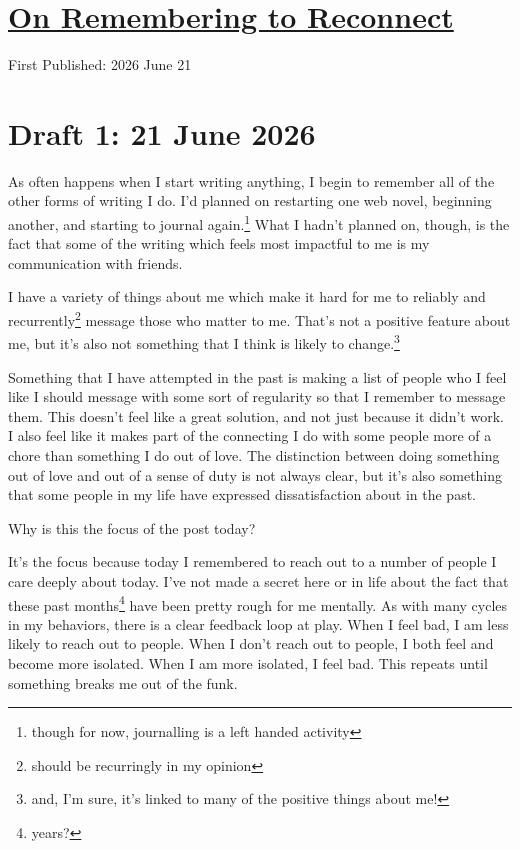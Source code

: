 \documentclass[12pt]{article}
\renewcommand{\,}{\textsuperscript{,}}
\begin{document}
  
\doublespacing  
\section{\href{remembering-reconnect.html}{On Remembering to Reconnect}}  
First Published: 2026 June 21

\section{Draft 1: 21 June 2026}

As often happens when I start writing anything, I begin to remember all of the other forms of writing I do.  
I'd planned on restarting one web novel, beginning another, and starting to journal again.\footnote{though for now, journalling is a left handed activity}  
What I hadn't planned on, though, is the fact that some of the writing which feels most impactful to me is my communication with friends.

I have a variety of things about me which make it hard for me to reliably and recurrently\footnote{should be recurringly in my opinion} message those who matter to me.  
That's not a positive feature about me, but it's also not something that I think is likely to change.\footnote{and, I'm sure, it's linked to many of the positive things about me!}

Something that I have attempted in the past is making a list of people who I feel like I should message with some sort of regularity so that I remember to message them.  
This doesn't feel like a great solution, and not just because it didn't work.  
I also feel like it makes part of the connecting I do with some people more of a chore than something I do out of love.  
The distinction between doing something out of love and out of a sense of duty is not always clear, but it's also something that some people in my life have expressed dissatisfaction about in the past.

Why is this the focus of the post today?

It's the focus because today I remembered to reach out to a number of people I care deeply about today.  
I've not made a secret here or in life about the fact that these past months\footnote{years?} have been pretty rough for me mentally.  
As with many cycles in my behaviors, there is a clear feedback loop at play.  
When I feel bad, I am less likely to reach out to people.  
When I don't reach out to people, I both feel and become more isolated.  
When I am more isolated, I feel bad.  
This repeats until something breaks me out of the funk.
\end{document}

